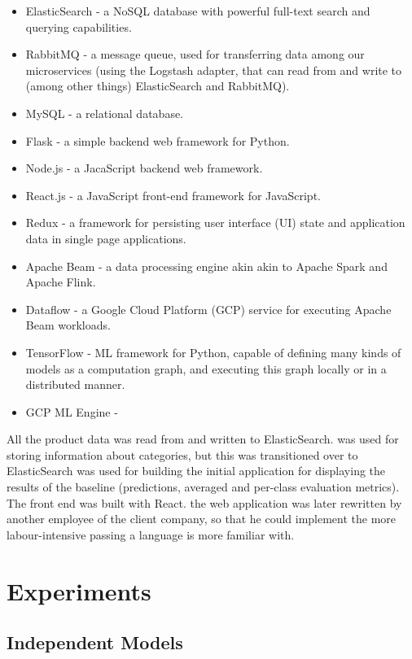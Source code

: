 \begin{itemize}
  \item ElasticSearch - a NoSQL database with powerful full-text search and querying capabilities.
  \item RabbitMQ - a message queue, used for transferring data among our microservices (using the Logstash adapter, that can read from and write to (among other things) ElasticSearch and RabbitMQ).
  \item MySQL - a relational database.
  \item Flask - a simple backend web framework for Python.
  \item Node.js - a JacaScript backend web framework.
  \item React.js - a JavaScript front-end framework for JavaScript.
  \item Redux - a framework for persisting user interface (UI) state and application data in single page applications.
  \item Apache Beam - a data processing engine akin akin to Apache Spark and Apache Flink.
  \item Dataflow - a Google Cloud Platform (GCP) service for executing Apache Beam workloads.
  \item TensorFlow - ML framework for Python, capable of defining many kinds of models as a computation graph, and executing this graph locally or in a distributed manner.
  \item GCP ML Engine - 
\end{itemize}

All the product data was read from and written to ElasticSearch.
was used for storing information about categories, but this was transitioned over to ElasticSearch
was used for building the initial application for displaying the results of the baseline (predictions, averaged and per-class evaluation metrics). The front end was built with React.
the web application was later rewritten by another employee of the client company, so  that he could implement the more labour-intensive  passing a language is more familiar with.

\section{Experiments}
\subsection{Independent Models}
\label{exp_models}

